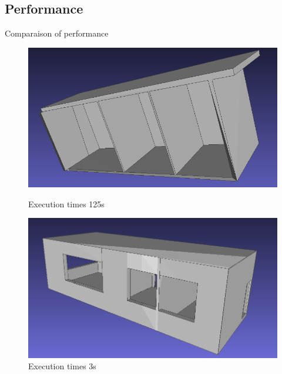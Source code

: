 \documentclass[10pt]{beamer}
\begin{document}
\subsection{Performance}
\begin{frame}{Comparaison of performance}

    \begin{figure}
      \centering
      
      \begin{minipage}[b]{0.40\textwidth}
        \centering
        \includegraphics[width=\textwidth]{../image/tzones.png}
        \caption{Execution times 125s}
       
      \end{minipage}\hfill
      
      \begin{minipage}[b]{0.40\textwidth}
        \centering
        \includegraphics[width=\textwidth]{../image/3zones_final.png}
        \caption{Execution times 3s}
      \end{minipage}
    
    \end{figure}
    
    \end{frame}
\end{document}
